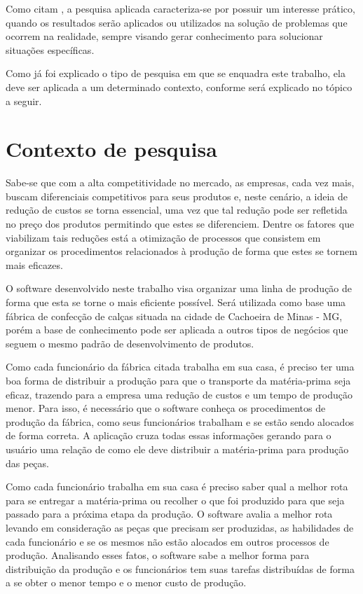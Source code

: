 \par Como citam , a pesquisa aplicada
caracteriza-se por possuir um interesse prático, quando os resultados serão aplicados ou utilizados na
solução de problemas que ocorrem na realidade, sempre visando gerar conhecimento
para solucionar situações específicas.

\par Como já foi explicado o tipo de pesquisa em que se enquadra este trabalho,
ela deve ser aplicada a um determinado contexto, conforme será explicado no
tópico a seguir.

\section{Contexto de pesquisa}

\par Sabe-se que com a alta competitividade no mercado, as empresas, cada vez mais,
buscam diferenciais competitivos para seus produtos e, neste cenário, a ideia
de redução de custos se torna essencial, uma vez que tal redução pode ser
refletida no preço dos produtos permitindo que estes se diferenciem. Dentre
os fatores que viabilizam tais reduções está a otimização de processos que
consistem em organizar os procedimentos relacionados à produção de forma que
estes se tornem mais eficazes.

\par O software desenvolvido neste trabalho visa organizar uma linha de produção
de forma que esta se torne o mais eficiente possível. Será utilizada como
base uma fábrica de confecção de calças situada na cidade de
Cachoeira de Minas - MG, porém a base de conhecimento pode ser aplicada a outros
tipos de negócios que seguem o mesmo padrão de desenvolvimento de produtos.

\par Como cada funcionário da fábrica citada trabalha em sua casa, é preciso ter
uma boa forma de distribuir a produção para que o transporte da matéria-prima
seja eficaz, trazendo para a empresa uma redução de custos e um tempo de
produção menor.
Para isso, é necessário que o software conheça os procedimentos de
produção da fábrica, como seus funcionários trabalham e se estão sendo alocados
de forma correta. A aplicação cruza todas essas informações gerando para o
usuário uma relação de como ele deve distribuir a matéria-prima para produção
das peças.

\par Como cada funcionário trabalha em sua casa é preciso saber qual a
melhor rota para se entregar a matéria-prima ou recolher o que foi produzido
para que seja passado para a próxima etapa da produção. O software avalia a
melhor rota levando em consideração as peças que precisam ser produzidas, as
habilidades de cada funcionário e se os mesmos não estão alocados em outros
processos de produção. Analisando esses fatos, o software sabe a melhor forma
para distribuição da produção e os funcionários tem suas tarefas distribuídas
de forma a se obter o menor tempo e o  menor custo de produção.


